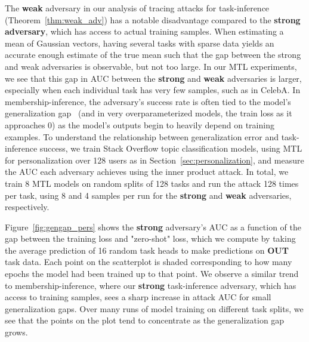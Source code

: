 The \textbf{weak} adversary in our analysis of tracing attacks for task-inference (Theorem~\ref{thm:weak_adv}) has a notable disadvantage compared to the \textbf{strong adversary}, which has access to actual training samples. When estimating a mean of Gaussian vectors, having several tasks with sparse data yields an accurate enough estimate of the true mean such that the gap between the strong and weak adversaries is observable, but not too large. In our MTL experiments, we see that this gap in AUC between the \textbf{strong} and \textbf{weak} adversaries is larger, especially when each individual task has very few samples, such as in CelebA. In membership-inference, the adversary's success rate is often tied to the model's generalization gap~\cite{2018-yeom-mioverfitting} (and in very overparameterized models, the train loss as it approaches 0) as the model's outputs begin to heavily depend on training examples. To understand the relationship between generalization error and task-inference success, we train Stack Overflow topic classification models, using MTL for personalization over 128 users as in Section~\ref{sec:personalization}, and measure the AUC each adversary achieves using the inner product attack. In total, we train 8 MTL models on random splits of 128 tasks and run the attack 128 times per task, using 8 and 4 samples per run for the \textbf{strong} and \textbf{weak} adversaries, respectively.

Figure~\ref{fig:gengap_pers} shows the \textbf{strong} adversary's AUC as a function of the gap between the training loss and "zero-shot" loss, which we compute by taking the average prediction of 16 random task heads to make predictions on \textbf{OUT} task data. Each point on the scatterplot is shaded corresponding to how many epochs the model had been trained up to that point. We observe a similar trend to membership-inference, where our \textbf{strong} task-inference adversary, which has access to training samples, sees a sharp increase in attack AUC for small generalization gaps. Over many runs of model training on different task splits, we see that the points on the plot tend to concentrate as the generalization gap grows.


